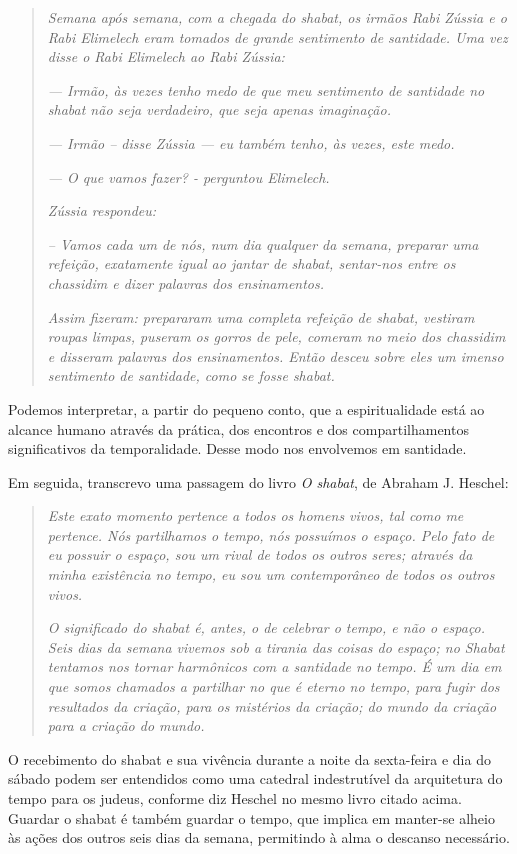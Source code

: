 \begin{quote}
\emph{Semana após semana, com a chegada do shabat, os irmãos Rabi Zússia
e o Rabi Elimelech eram tomados de grande sentimento de santidade. Uma
vez disse o Rabi Elimelech ao Rabi Zússia: }

\emph{--- Irmão, às vezes tenho medo de que meu sentimento de santidade
no shabat não seja verdadeiro, que seja apenas imaginação. }

\emph{--- Irmão -- disse Zússia --- eu também tenho, às vezes, este
medo.}

\emph{--- O que vamos fazer? - perguntou Elimelech. }

\emph{Zússia respondeu: }

\emph{-- Vamos cada um de nós, num dia qualquer da semana, preparar uma
refeição, exatamente igual ao jantar de shabat, sentar-nos entre os
chassidim e dizer palavras dos ensinamentos. }

\emph{Assim fizeram: prepararam uma completa refeição de shabat,
vestiram roupas limpas, puseram os gorros de pele, comeram no meio dos
chassidim e disseram palavras dos ensinamentos. Então desceu sobre eles
um imenso sentimento de santidade, como se fosse shabat.}
\end{quote}

Podemos interpretar, a partir do pequeno conto, que a espiritualidade
está ao alcance humano através da prática, dos encontros e dos
compartilhamentos significativos da temporalidade. Desse modo nos
envolvemos em santidade.

Em seguida, transcrevo uma passagem do livro \emph{O shabat}, de Abraham
J. Heschel:

\begin{quote}
\emph{Este exato momento pertence a todos os homens vivos, tal como me
pertence. Nós partilhamos o tempo, nós possuímos o espaço. Pelo fato de
eu possuir o espaço, sou um rival de todos os outros seres; através da
minha existência no tempo, eu sou um contemporâneo de todos os outros
vivos.}

\emph{O significado do shabat é, antes, o de celebrar o tempo, e não o
espaço. Seis dias da semana vivemos sob a tirania das coisas do espaço;
no Shabat tentamos nos tornar harmônicos com a santidade no tempo. É um
dia em que somos chamados a partilhar no que é eterno no tempo, para
fugir dos resultados da criação, para os mistérios da criação; do mundo
da criação para a criação do mundo.}
\end{quote}

O recebimento do shabat e sua vivência durante a noite da sexta-feira e
dia do sábado podem ser entendidos como uma catedral indestrutível da
arquitetura do tempo para os judeus, conforme diz Heschel no mesmo livro
citado acima. Guardar o shabat é também guardar o tempo, que implica em
manter-se alheio às ações dos outros seis dias da semana, permitindo à
alma o descanso necessário.

